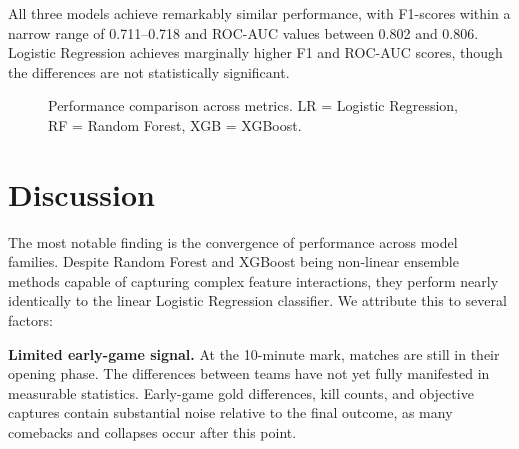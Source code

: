 \documentclass[runningheads]{llncs}
\begin{document}
All three models achieve remarkably similar performance, with F1-scores within a narrow range of 0.711--0.718 and ROC-AUC values between 0.802 and 0.806. Logistic Regression achieves marginally higher F1 and ROC-AUC scores, though the differences are not statistically significant.

\begin{figure}[t]
\centering
{}
\caption{Performance comparison across metrics. LR = Logistic Regression, RF = Random Forest, XGB = XGBoost.}
\label{fig:bar}
\end{figure}

\section{Discussion}
The most notable finding is the convergence of performance across model families. Despite Random Forest and XGBoost being non-linear ensemble methods capable of capturing complex feature interactions, they perform nearly identically to the linear Logistic Regression classifier. We attribute this to several factors:

\textbf{Limited early-game signal.} At the 10-minute mark, matches are still in their opening phase. The differences between teams have not yet fully manifested in measurable statistics. Early-game gold differences, kill counts, and objective captures contain substantial noise relative to the final outcome, as many comebacks and collapses occur after this point.
\end{document}
